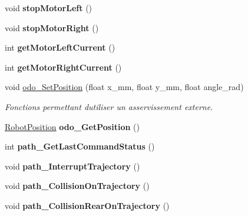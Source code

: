 \begin{DoxyCompactItemize}
void {\bfseries stop\+Motor\+Left} ()
\item 
\mbox{\label{classAsservDriver_ab24bc1636143db604ecbad3b18a17c8c}} 
void {\bfseries stop\+Motor\+Right} ()
\item 
\mbox{\label{classAsservDriver_ab93d873dc060cff42befa9e50a4a0b32}} 
int {\bfseries get\+Motor\+Left\+Current} ()
\item 
\mbox{\label{classAsservDriver_ace1b02fcab067c77ee71a134614ace50}} 
int {\bfseries get\+Motor\+Right\+Current} ()
\item 
\mbox{\label{classAsservDriver_a5806e26618e1b2a4590b67ba55a55165}} 
void \hyperlink{classAsservDriver_a5806e26618e1b2a4590b67ba55a55165}{odo\+\_\+\+Set\+Position} (float x\+\_\+mm, float y\+\_\+mm, float angle\+\_\+rad)
\begin{DoxyCompactList}\small\item\em Fonctions permettant d\textquotesingle{}utiliser un asservissement externe. \end{DoxyCompactList}\item 
\mbox{\label{classAsservDriver_a0a62fbec28bfc5510eb75b6ad434baed}} 
\hyperlink{structRobotPosition}{Robot\+Position} {\bfseries odo\+\_\+\+Get\+Position} ()
\item 
\mbox{\label{classAsservDriver_ac4b8627777e76c145265a8e988852484}} 
int {\bfseries path\+\_\+\+Get\+Last\+Command\+Status} ()
\item 
\mbox{\label{classAsservDriver_affc4e315cdd03c826cea17114d02a19c}} 
void {\bfseries path\+\_\+\+Interrupt\+Trajectory} ()
\item 
\mbox{\label{classAsservDriver_a6af616f39706df060f1b81b2047c7a7f}} 
void {\bfseries path\+\_\+\+Collision\+On\+Trajectory} ()
\item 
\mbox{\label{classAsservDriver_a370b2f287b352211c07a023edcb63bc7}} 
void {\bfseries path\+\_\+\+Collision\+Rear\+On\+Trajectory} ()
\item 
\mbox{\label{classAsservDriver_a7f18af77a8524e09f8c9b024d4f0e4b8}} 

\end{DoxyCompactItemize}
